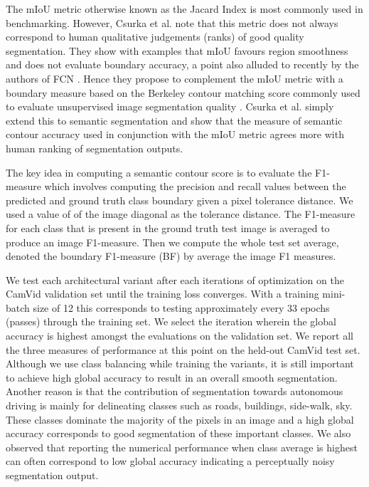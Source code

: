 \documentclass[10pt,journal,compsoc]{IEEEtran}
\begin{document}
The mIoU metric otherwise known as the Jacard Index is most commonly used in benchmarking. However,  Csurka et al. \cite{csurka2013good} note that this metric does not always correspond to human qualitative judgements (ranks) of good quality segmentation. They show with examples that mIoU favours region smoothness and does not evaluate boundary accuracy, a point also alluded to recently by the authors of FCN \cite{FCNnew}. Hence they propose to complement the mIoU metric with a boundary measure based on the Berkeley contour matching score commonly used to evaluate unsupervised image segmentation quality \cite{martin2004learning}. Csurka et al. \cite{csurka2013good} simply extend this to semantic segmentation and show that the measure of semantic contour accuracy used in conjunction with the mIoU metric agrees more with human ranking of segmentation outputs. 

The key idea in computing a semantic contour score is to evaluate the F1-measure \cite{martin2004learning} which involves computing the precision and recall values between the predicted and ground truth class boundary given a pixel tolerance distance. We used a value of  of the image diagonal as the tolerance distance. The F1-measure for each class that is present in the ground truth test image is averaged to produce an image F1-measure. Then we compute the whole test set average, denoted the boundary F1-measure (BF) by average the image F1 measures.

We test each architectural variant after each  iterations of optimization on the CamVid validation set until the training loss converges. With a training mini-batch size of 12 this corresponds to testing approximately every 33 epochs (passes) through the training set. We select the iteration wherein the global accuracy is highest amongst the evaluations on the validation set. We report all the three measures of performance at this point on the held-out CamVid test set. Although we use class balancing while training the variants, it is still important to achieve high global accuracy to result in an overall smooth segmentation. Another reason is that the contribution of segmentation towards autonomous driving is mainly for delineating classes such as roads, buildings, side-walk, sky. These classes dominate the majority of the pixels in an image and a high global accuracy corresponds to good segmentation of these important classes. We also observed that reporting the numerical performance when class average is highest can often correspond to low global accuracy indicating a perceptually noisy segmentation output.
\end{document}
